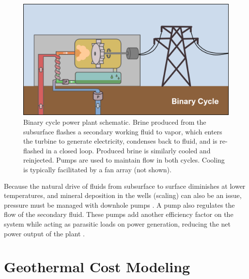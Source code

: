 \begin{figure}
\centering
\includegraphics[width=.9\textwidth]{templates/images/Figure-BinaryPlant_Schematic.png}
\caption[Binary cycle power plant schematic]{Binary cycle power plant schematic. Brine produced from the subsurface flashes a secondary working fluid to vapor, which enters the turbine to generate electricity, condenses back to fluid, and is re-flashed in a closed loop. Produced brine is similarly cooled and reinjected. Pumps are used to maintain flow in both cycles. Cooling is typically facilitated by a fan array (not shown).}
\label{fig:binary_plant}
\end{figure}

Because the natural drive of fluids from subsurface to surface diminishes at lower temperatures, and mineral deposition in the wells (scaling) can also be an issue, pressure must be managed with downhole pumps \citep[p.\ 153]{dipippo_geothermal_2012}. A pump also regulates the flow of the secondary fluid. These pumps add another efficiency factor on the system while acting as parasitic loads on power generation, reducing the net power output of the plant \citep[p.\ 4]{lowry_implications_2017}.

\section{Geothermal Cost Modeling}\label{ch2:cost_models}


